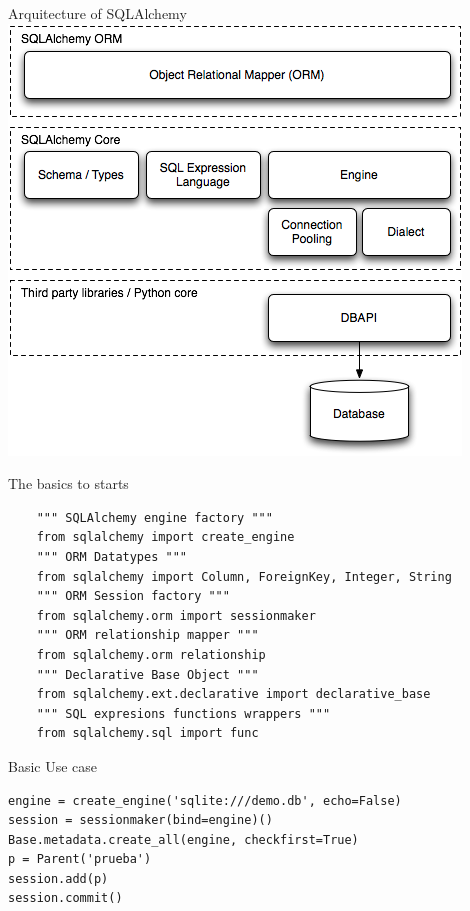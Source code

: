 \documentclass[seagull]{beamer}
\begin{document}
\begin{frame}{Arquitecture of SQLAlchemy}
	\centering\includegraphics[scale=0.5]{sqla-arch.png}
\end{frame}

\begin{frame}[fragile]{The basics to starts}
\begin{verbatim}
	""" SQLAlchemy engine factory """
	from sqlalchemy import create_engine
	""" ORM Datatypes """ 
	from sqlalchemy import Column, ForeignKey, Integer, String
	""" ORM Session factory """ 
	from sqlalchemy.orm import sessionmaker
	""" ORM relationship mapper """ 
	from sqlalchemy.orm relationship
	""" Declarative Base Object """ 
	from sqlalchemy.ext.declarative import declarative_base
	""" SQL expresions functions wrappers """ 
	from sqlalchemy.sql import func
\end{verbatim}
\end{frame}

\begin{frame}[fragile]{Basic Use case}
\begin{verbatim}
engine = create_engine('sqlite:///demo.db', echo=False)
session = sessionmaker(bind=engine)()
Base.metadata.create_all(engine, checkfirst=True)
p = Parent('prueba')
session.add(p)
session.commit()
\end{verbatim}
\end{frame}
\end{document}
